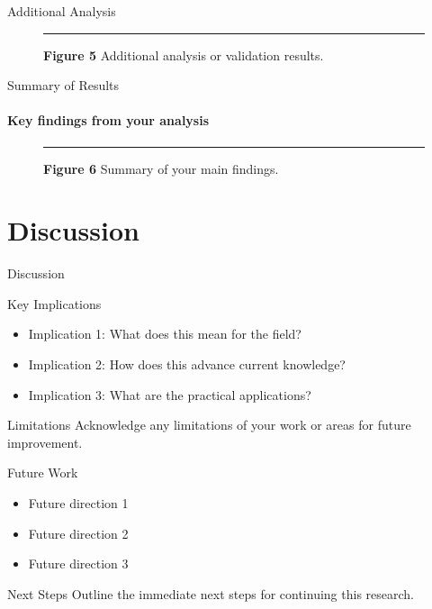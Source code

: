 \documentclass[aspectratio=169]{beamer}
\begin{document}
\begin{frame}{Additional Analysis}
  \begin{figure}
    \centering
    \rule{0.8\textwidth}{0.5\textheight} %
    {\small \textbf{Figure 5} \textbar{} Additional analysis or validation results.}
  \end{figure}
\end{frame}

\begin{frame}{Summary of Results}
  \framesubtitle{Key findings from your analysis}
  \begin{figure}
    \centering
    \rule{0.8\textwidth}{0.5\textheight} %
    {\small \textbf{Figure 6} \textbar{} Summary of your main findings.}
  \end{figure}
\end{frame}

\section{Discussion}

\begin{frame}{Discussion}
  \begin{alertblock}{Key Implications}
    \begin{itemize}
      \item Implication 1: What does this mean for the field?
      \item Implication 2: How does this advance current knowledge?
      \item Implication 3: What are the practical applications?
    \end{itemize}
  \end{alertblock}
  
  \begin{block}{Limitations}
    Acknowledge any limitations of your work or areas for future improvement.
  \end{block}
\end{frame}

\begin{frame}{Future Work}
  \begin{itemize}
    \item Future direction 1
    \item Future direction 2
    \item Future direction 3
  \end{itemize}
  
  \begin{block}{Next Steps}
    Outline the immediate next steps for continuing this research.
  \end{block}
\end{frame}
\end{document}
